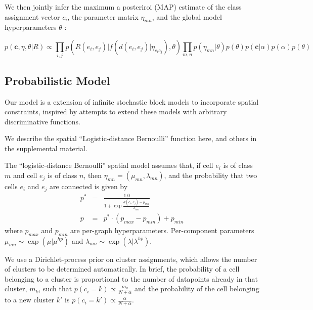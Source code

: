 \documentclass{article}
\renewcommand{\vec}[1]{\mathbf{#1}}
\begin{document}
We then jointly infer the maximum a posteriroi (MAP) estimate of the
class assignment vector ${c_i}$, the parameter matrix $\eta_{mn}$, and
the global model hyperparameters $\theta$ :

\begin{equation}
  p(\vec{c}, \eta, \theta | R ) \propto \prod_{i, j} p(R(e_i, e_j) | f(d(e_i, e_j) | \eta_{c_ic_j}), \theta) \prod_{m, n} p(\eta_{mn} | \theta)  p(\theta) p(\vec{c} | \alpha) p(\alpha) p(\theta)
\end{equation}



\subsection{Probabilistic Model}

Our model is a extension of infinite stochastic block models
\autocite{Kemp2006a,Xu2006} to incorporate spatial constraints,
inspired by attempts to extend these models with arbitrary
discriminative functions\autocite{Murphy2012}.


We describe the spatial ``Logistic-distance Bernoulli''  function here,
and others in the supplemental material. 

The ``logistic-distance Bernoulli'' spatial model assumes that, if cell
$e_i$ is of class $m$ and cell $e_j$ is of class $n$, then $\eta_{mn}
= (\mu_{mn}, \lambda_{mn})$, and the probability that two cells $e_i$
and $e_j$ are connected is given by
\begin{eqnarray}
p^* &=& \frac{1.0}{1 + \exp \frac{d(e_i, e_j) - \mu_{mn}}{\lambda_{mn}}}\\
p &= & p^* \cdot (p_{max} - p_{min}) + p_{min}
\end{eqnarray}
where $p_{max}$ and $p_{min}$ are per-graph hyperparameters. Per-component parameters $\mu_{mn} \sim \exp(\mu | \mu^{hp})$ and $\lambda_{mn} \sim \exp(\lambda | \lambda^{hp})$. 

We use a Dirichlet-process prior on cluster assignments, which allows
the number of clusters to be determined automatically. In brief, the
probability of a cell belonging to a cluster is proportional to the
number of datapoints already in that cluster, $m_k$, such that $p(c_i
= k) \propto \frac{m_k}{N + \alpha}$ and the probability of the cell
belonging to a new cluster $k'$ is $p(c_i = k') \propto
\frac{\alpha}{N + \alpha}$.
\end{document}
